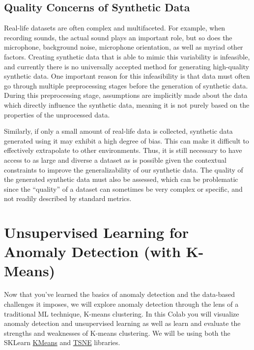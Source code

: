   \subsection{Quality Concerns of Synthetic Data}
  
  Real-life datasets are often complex and multifaceted. For example, when recording sounds, the actual sound plays an important role, but so does the microphone, background noise, microphone orientation, as well as myriad other factors. Creating synthetic data that is able to mimic this variability is infeasible, and currently there is no universally accepted method for generating high-quality synthetic data. One important reason for this infeasibility is that data must often go through multiple preprocessing stages before the generation of synthetic data. During this preprocessing stage, assumptions are implicitly made about the data which directly influence the synthetic data, meaning it is not purely based on the properties of the unprocessed data.
  
  Similarly, if only a small amount of real-life data is collected, synthetic data generated using it may exhibit a high degree of bias. This can make it difficult to effectively extrapolate to other environments. Thus, it is still necessary to have access to as large and diverse a dataset as is possible given the contextual constraints to improve the generalizability of our synthetic data. The quality of the generated synthetic data must also be assessed, which can be problematic since the “quality” of a dataset can sometimes be very complex or specific, and not readily described by standard metrics.
  
  \section{Unsupervised Learning for Anomaly Detection (with K-Means)}
  
Now that you’ve learned the basics of anomaly detection and the data-based challenges it imposes, we will explore anomaly detection through the lens of a traditional ML technique, K-means clustering. In this Colab you will visualize anomaly detection and unsupervised learning as well as learn and evaluate the strengths and weaknesses of K-means clustering. We will be using both the SKLearn \href{https://scikit-learn.org/stable/modules/generated/sklearn.cluster.KMeans.html}{KMeans} and \href{https://scikit-learn.org/stable/modules/generated/sklearn.manifold.TSNE.html}{TSNE} libraries.

